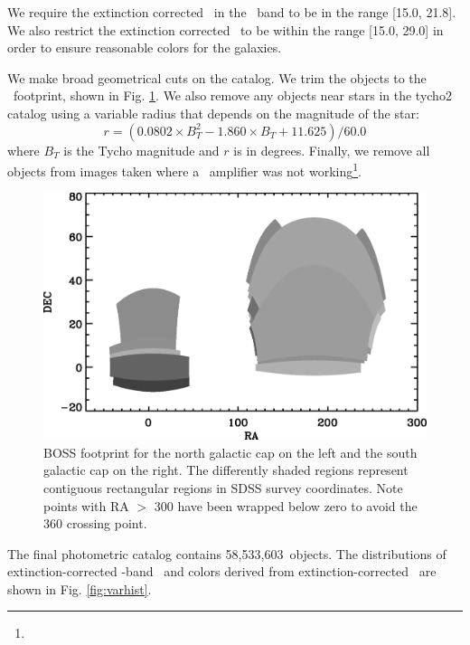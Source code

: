 \documentclass[preprint]{aastex}
\newcommand{\modelrmin}{15.0}
\newcommand{\modelrmax}{29.0}
\newcommand{\rmin}{15.0}
\newcommand{\rmax}{21.8}
\newcommand{\nphoto}{58,533,603}
\begin{document}
We require the extinction corrected \citep{Schlegel98} \cmodelmag\ in the \rmag\
band to be in the range [\rmin, \rmax].  We also restrict the extinction corrected
\modelmag\ to be within the range [\modelrmin, \modelrmax] in order to ensure
reasonable colors for the galaxies.

We make broad geometrical cuts on the catalog.  We trim the objects to the
\boss\ footprint, shown in Fig. \ref{fig:footprint}. We also remove any
objects near stars in the tycho2 catalog \citep{tycho2} using a variable radius
that depends on the magnitude of the star:
\begin{equation}
r = (0.0802\times B_T^2 - 1.860\times B_T + 11.625)/60.0
\end{equation}
where $B_T$ is the Tycho magnitude and $r$ is in degrees.  Finally, we remove
all objects from images taken where a \umag\ amplifier was not working\footnote{\DRsevcaveat}.

\begin{figure}[t] \centering
 \centering 
 \includegraphics[scale=0.75]{figures/boss-poly-coverage.eps}
 \caption{BOSS footprint for the north galactic cap on the left
 and the south galactic cap on the right.  The differently shaded
 regions represent contiguous rectangular regions in SDSS survey coordinates.
 Note points with RA $>$ 300 have been wrapped below zero 
 to avoid the 360 crossing point.}
 \label{fig:footprint}
\end{figure}

The final photometric catalog contains \nphoto\ objects.  The distributions of
extinction-corrected \rmag-band \cmodelmag\ and colors derived from
extinction-corrected \modelmag\ are shown in Fig. \ref{fig:varhist}.
\end{document}
